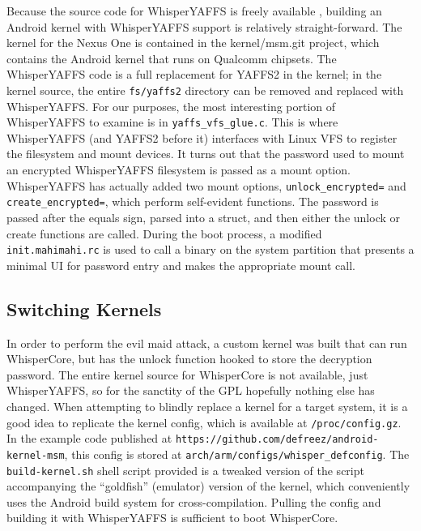 Because the source code for WhisperYAFFS is freely available \cite{whisperyaffs}, building an Android kernel with WhisperYAFFS
support is relatively straight-forward. The kernel for the Nexus One is contained in the kernel/msm.git project, which contains the
Android kernel that runs on Qualcomm chipsets.  The WhisperYAFFS code is a full replacement for YAFFS2 in the kernel; in the kernel
source, the entire \texttt{fs/yaffs2} directory can be removed and replaced with WhisperYAFFS.  For our purposes, the most
interesting portion of WhisperYAFFS to examine is in \texttt{yaffs\_vfs\_glue.c}.  This is where WhisperYAFFS (and YAFFS2 before it)
interfaces with Linux VFS to register the filesystem and mount devices.  It turns out that the password used to mount an encrypted
WhisperYAFFS filesystem is passed as a mount option.  WhisperYAFFS has actually added two mount options, \texttt{unlock\_encrypted=}
and \texttt{create\_encrypted=}, which perform self-evident functions.  The password is passed after the equals sign, parsed into a
struct, and then either the unlock or create functions are called.  During the boot process, a modified \texttt{init.mahimahi.rc} is
used to call a binary on the system partition that presents a minimal UI for password entry and makes the appropriate mount call. 

\subsection{Switching Kernels}
In order to perform the evil maid attack, a custom kernel was built that can run WhisperCore, but has the unlock function hooked
to store the decryption password.  The entire kernel source for WhisperCore is not available, just WhisperYAFFS, so for the sanctity
of the GPL hopefully nothing else has changed.  When attempting to blindly replace a kernel for a target system, it is a good idea
to replicate the kernel config, which is available at \texttt{/proc/config.gz}.  In the example code published at
\texttt{https://github.com/defreez/android-kernel-msm}, this config is stored at \texttt{arch/arm/configs/whisper\_defconfig}.  The
\texttt{build-kernel.sh} shell script provided is a tweaked version of the script accompanying the ``goldfish'' (emulator) version
of the kernel, which conveniently uses the Android build system for cross-compilation.  Pulling the config and building it with
WhisperYAFFS is sufficient to boot WhisperCore.

